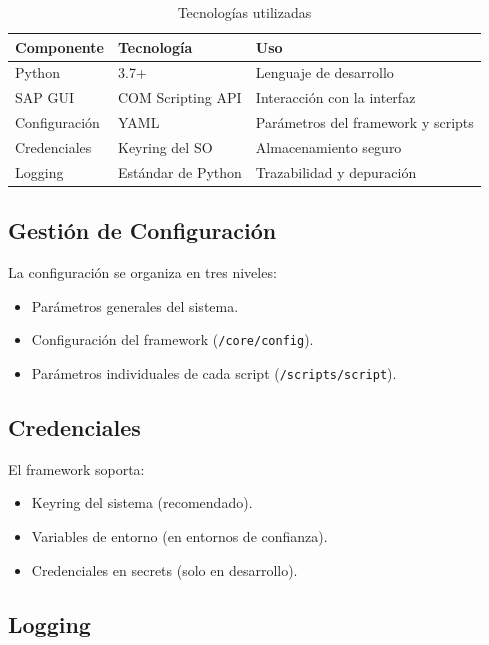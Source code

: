 \documentclass[11pt,a4paper]{article}
\begin{document}
\begin{table}[H]
\centering
\renewcommand{\arraystretch}{1.2} %
\begin{tabular}{p{3cm} p{4.5cm} p{6cm}}
\toprule
\textbf{Componente} & \textbf{Tecnología} & \textbf{Uso} \\
\midrule
Python & 3.7+ & Lenguaje de desarrollo \\
SAP GUI & COM Scripting API & Interacción con la interfaz \\
Configuración & YAML & Parámetros del framework y scripts \\
Credenciales & Keyring del SO & Almacenamiento seguro \\
Logging & Estándar de Python & Trazabilidad y depuración \\
\bottomrule
\end{tabular}
\caption{Tecnologías utilizadas}
\end{table}

\subsection{Gestión de Configuración}

La configuración se organiza en tres niveles:

\begin{itemize}
    \item Parámetros generales del sistema.
    \item Configuración del framework (\texttt{/core/config}).
    \item Parámetros individuales de cada script (\texttt{/scripts/script}).
\end{itemize}

\subsection{Credenciales}

El framework soporta:

\begin{itemize}
    \item Keyring del sistema (recomendado).
    \item Variables de entorno (en entornos de confianza).
    \item Credenciales en secrets (solo en desarrollo).
\end{itemize}

\subsection{Logging}
\end{document}
